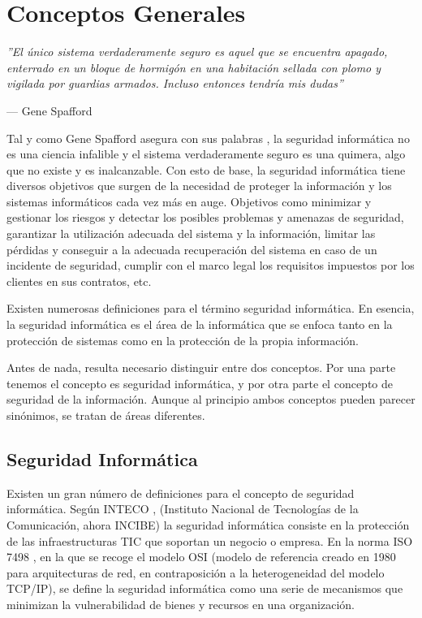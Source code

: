\chapter{Conceptos Generales}

\epigraph{\textit{''El único sistema verdaderamente seguro es aquel que se encuentra apagado, enterrado en un bloque de hormigón en una habitación sellada con plomo y vigilada por guardias armados. Incluso entonces tendría mis dudas''}}{--- Gene Spafford}

Tal y como Gene Spafford asegura con sus palabras \cite{gene-spafford}, la seguridad informática no es una ciencia infalible y el sistema verdaderamente seguro es una quimera, algo que no existe y es inalcanzable. Con esto de base, la seguridad informática tiene diversos objetivos que surgen de la necesidad de proteger la información y los sistemas informáticos cada vez más en auge. Objetivos como minimizar y gestionar los riesgos y detectar los posibles problemas y amenazas de seguridad, garantizar la utilización adecuada del sistema y la información, limitar las pérdidas y conseguir a la adecuada recuperación del sistema en caso de un incidente de seguridad, cumplir con el marco legal los requisitos impuestos por los clientes en sus contratos, etc.

Existen numerosas definiciones para el término seguridad informática. En esencia, la seguridad informática es el área de la informática que se enfoca tanto en la protección de sistemas como en la protección de la propia información.

Antes de nada, resulta necesario distinguir entre dos conceptos. Por una parte tenemos el concepto es seguridad informática, y por otra parte el concepto de seguridad de la información. Aunque al principio ambos conceptos pueden parecer sinónimos, se tratan de áreas diferentes.


\section{Seguridad Informática}

Existen un gran número de definiciones para el concepto de seguridad informática. Según INTECO \cite{inteco-defs}, (Instituto Nacional de Tecnologías de la Comunicación, ahora INCIBE) la seguridad informática consiste en la protección de las infraestructuras TIC que soportan un negocio o empresa. En la norma ISO 7498 \cite{iso-7498}, en la que se recoge el modelo OSI (modelo de referencia creado en 1980 para arquitecturas de red, en contraposición a la heterogeneidad del modelo TCP/IP), se define la seguridad informática como una serie de mecanismos que minimizan la vulnerabilidad de bienes y recursos en una organización.

